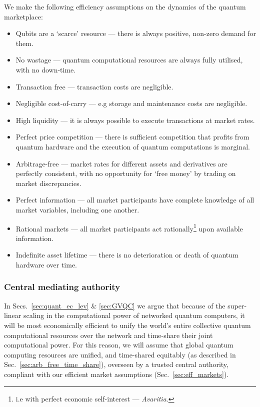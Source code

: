 \begin{postulate}\label{post:market_eff} We make the following efficiency assumptions on the dynamics of the quantum marketplace:
\begin{itemize}
	\item Qubits are a `scarce' resource --- there is always positive, non-zero demand for them.
	\item No wastage --- quantum computational resources are always fully utilised, with no down-time.
	\item Transaction free --- transaction costs are negligible.
	\item Negligible cost-of-carry --- e.g storage and maintenance costs are negligible.
	\item High liquidity --- it is always possible to execute transactions at market rates.
	\item Perfect price competition --- there is sufficient competition that profits from quantum hardware and the execution of quantum computations is marginal.
	\item Arbitrage-free --- market rates for different assets and derivatives are perfectly consistent, with no opportunity for `free money' by trading on market discrepancies.
	\item Perfect information --- all market participants have complete knowledge of all market variables, including one another.
	\item Rational markets --- all market participants act rationally\footnote{i.e with perfect economic self-interest --- \textit{Avaritia}.} upon available information.
	\item Indefinite asset lifetime --- there is no deterioration or death of quantum hardware over time.
\end{itemize}
\end{postulate}

%
%

\subsubsection{Central mediating authority}

In Secs.~\ref{sec:quant_ec_lev} \& \ref{sec:GVQC} we argue that because of the super-linear scaling in the computational power of networked quantum computers, it will be most economically efficient to unify the world's entire collective quantum computational resources over the network and time-share their joint computational power. For this reason, we will assume that global quantum computing resources are unified, and time-shared equitably (as described in Sec.~\ref{sec:arb_free_time_share}), overseen by a trusted central authority, compliant with our efficient market assumptions (Sec.~\ref{sec:eff_markets}).

